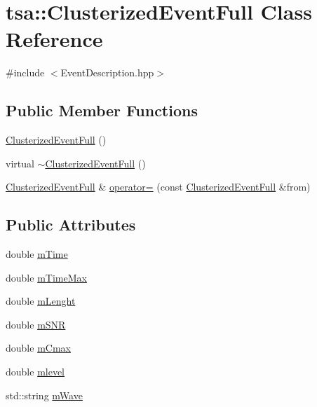 \hypertarget{classtsa_1_1_clusterized_event_full}{}\section{tsa\+:\+:Clusterized\+Event\+Full Class Reference}
\label{classtsa_1_1_clusterized_event_full}


{\ttfamily \#include $<$Event\+Description.\+hpp$>$}

\subsection*{Public Member Functions}
\begin{DoxyCompactItemize}
\item 
\hyperlink{classtsa_1_1_clusterized_event_full_a93366cd0d1fb34357291f8e7c0838fce}{Clusterized\+Event\+Full} ()
\item 
virtual \hyperlink{classtsa_1_1_clusterized_event_full_a72341c0cabcf33d0cd74eb8396fb4cfa}{$\sim$\+Clusterized\+Event\+Full} ()
\item 
\hyperlink{classtsa_1_1_clusterized_event_full}{Clusterized\+Event\+Full} \& \hyperlink{classtsa_1_1_clusterized_event_full_a59d5af3b33fe416f076a71e127e55e4b}{operator=} (const \hyperlink{classtsa_1_1_clusterized_event_full}{Clusterized\+Event\+Full} \&from)
\end{DoxyCompactItemize}
\subsection*{Public Attributes}
\begin{DoxyCompactItemize}
\item 
double \hyperlink{classtsa_1_1_clusterized_event_full_a0fda853ee9d8794a2d48aa67cf32139d}{m\+Time}
\item 
double \hyperlink{classtsa_1_1_clusterized_event_full_ab5bf41bc3aee190a3bacbcf0014151e4}{m\+Time\+Max}
\item 
double \hyperlink{classtsa_1_1_clusterized_event_full_a65296146ead1496fddcc1f574884a6c1}{m\+Lenght}
\item 
double \hyperlink{classtsa_1_1_clusterized_event_full_ad727b114f41379abfbf5eaddbe86b51f}{m\+S\+NR}
\item 
double \hyperlink{classtsa_1_1_clusterized_event_full_a79694874453fcf2219e339c3d131ba27}{m\+Cmax}
\item 
double \hyperlink{classtsa_1_1_clusterized_event_full_a3defaaf04582b787b42b7fd0b6837058}{mlevel}
\item 
std\+::string \hyperlink{classtsa_1_1_clusterized_event_full_ad3d7bb3e8a5e4ebfea14045ed7281c99}{m\+Wave}
\end{DoxyCompactItemize}


